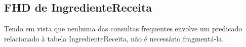 \documentclass[12pt,a4paper]{article}
\begin{document}
\subsection{FHD de IngredienteReceita}

Tendo em vista que nenhuma das consultas frequentes envolve um predicado relacionado à tabela IngredienteReceita, não é necessário fragmentá-la.
\end{document}
